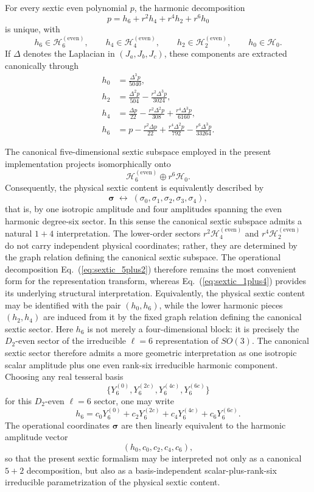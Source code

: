 For every sextic even polynomial $p$, the harmonic decomposition
\[
p = h_6 + r^2 h_4 + r^4 h_2 + r^6 h_0
\]
is unique, with
\[
h_6\in\mathcal H_6^{(\mathrm{even})},\qquad
h_4\in\mathcal H_4^{(\mathrm{even})},\qquad
h_2\in\mathcal H_2^{(\mathrm{even})},\qquad
h_0\in\mathcal H_0.
\]
If $\Delta$ denotes the Laplacian in $(J_a,J_b,J_c)$, these components are
extracted canonically through
\begin{align}
h_0 &= \frac{\Delta^3 p}{5040},\\
h_2 &= \frac{\Delta^2 p}{504}-\frac{r^2\Delta^3 p}{3024},\\
h_4 &= \frac{\Delta p}{22}-\frac{r^2\Delta^2 p}{308}
+\frac{r^4\Delta^3 p}{6160},\\
h_6 &= p-\frac{r^2\Delta p}{22}
+\frac{r^4\Delta^2 p}{792}
-\frac{r^6\Delta^3 p}{33264}.
\end{align}

The canonical five-dimensional sextic subspace employed in the present
implementation projects isomorphically onto
\[
\mathcal H_6^{(\mathrm{even})}\oplus r^6\mathcal H_0.
\]
Consequently, the physical sextic content is equivalently described by
\begin{equation}
\boldsymbol\sigma \;\longleftrightarrow\;
(\sigma_0,\sigma_1,\sigma_2,\sigma_3,\sigma_4),
\label{eq:sextic_1plus4}
\end{equation}
that is, by one isotropic amplitude and four amplitudes spanning the even
harmonic degree-six sector.  In this sense the canonical sextic subspace admits
a natural $1+4$ interpretation.  The lower-order sectors
$r^2\mathcal H_4^{(\mathrm{even})}$ and
$r^4\mathcal H_2^{(\mathrm{even})}$ do not carry independent physical
coordinates; rather, they are determined by the graph relation defining the
canonical sextic subspace.  The operational decomposition
Eq.~(\ref{eq:sextic_5plus2}) therefore remains the most convenient form for the
representation transform, whereas Eq.~(\ref{eq:sextic_1plus4}) provides its
underlying structural interpretation.  Equivalently, the physical sextic
content may be identified with the pair $(h_0,h_6)$, while the lower harmonic
pieces $(h_2,h_4)$ are induced from it by the fixed graph relation defining the
canonical sextic sector.  Here $h_6$ is not merely a four-dimensional block:
it is precisely the $D_2$-even sector of the irreducible $\ell=6$
representation of $SO(3)$.  The canonical sextic sector therefore admits a
more geometric interpretation as one isotropic scalar amplitude plus one even
rank-six irreducible harmonic component.  Choosing any real tesseral basis
\[
\{Y_6^{(0)},Y_6^{(2c)},Y_6^{(4c)},Y_6^{(6c)}\}
\]
for this $D_2$-even $\ell=6$ sector, one may write
\[
h_6=c_0Y_6^{(0)}+c_2Y_6^{(2c)}+c_4Y_6^{(4c)}+c_6Y_6^{(6c)}.
\]
The operational coordinates $\boldsymbol\sigma$ are then linearly equivalent to
the harmonic amplitude vector
\[
(h_0,c_0,c_2,c_4,c_6),
\]
so that the present sextic formalism may be interpreted not only as a
canonical $5+2$ decomposition, but also as a basis-independent
scalar-plus-rank-six irreducible parametrization of the physical sextic
content.

